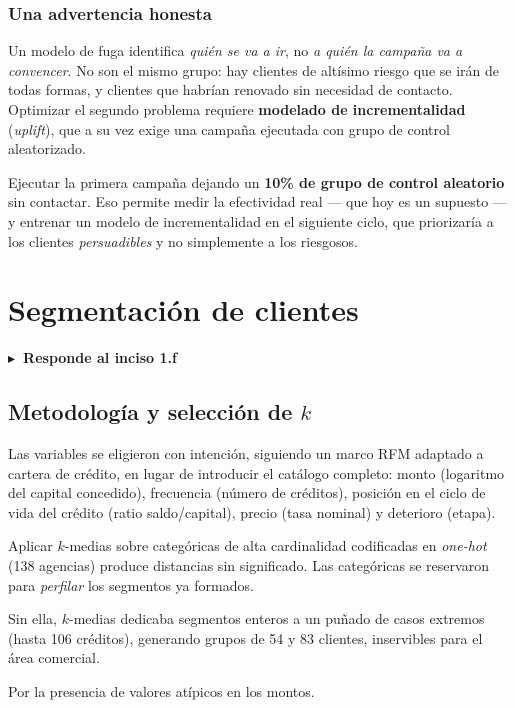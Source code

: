 \documentclass[11pt,a4paper]{article}
\newcommand{\inciso}[1]{%
  \vspace{0.2em}\noindent\textcolor{gacento}{\sffamily\bfseries\small
  $\blacktriangleright$~Responde al inciso #1}\vspace{0.3em}\par}
\begin{document}
\subsubsection*{Una advertencia honesta}

Un modelo de fuga identifica \emph{quién se va a ir}, no \emph{a quién la campaña
va a convencer}. No son el mismo grupo: hay clientes de altísimo riesgo que se
irán de todas formas, y clientes que habrían renovado sin necesidad de contacto.
Optimizar el segundo problema requiere \textbf{modelado de incrementalidad}
(\emph{uplift}), que a su vez exige una campaña ejecutada con grupo de control
aleatorizado.

\begin{hallazgo}
Ejecutar la primera campaña dejando un \textbf{10\% de grupo de control aleatorio}
sin contactar. Eso permite medir la efectividad real --- que hoy es un supuesto ---
y entrenar un modelo de incrementalidad en el siguiente ciclo, que priorizaría a
los clientes \emph{persuadibles} y no simplemente a los riesgosos.
\end{hallazgo}

\section{Segmentación de clientes}
\label{sec:segmentacion}
\inciso{1.f}

\subsection{Metodología y selección de $k$}

Las variables se eligieron con intención, siguiendo un marco RFM adaptado a
cartera de crédito, en lugar de introducir el catálogo completo: monto
(logaritmo del capital concedido), frecuencia (número de créditos), posición en el
ciclo de vida del crédito (ratio saldo/capital), precio (tasa nominal) y
deterioro (etapa).

\begin{description}[leftmargin=1.4em,style=nextline,nosep]
\item[Sólo variables numéricas] Aplicar $k$-medias sobre categóricas de alta
      cardinalidad codificadas en \emph{one-hot} (138 agencias) produce distancias
      sin significado. Las categóricas se reservaron para \emph{perfilar} los
      segmentos ya formados.
\item[Winsorización en los percentiles 1 y 99] Sin ella, $k$-medias dedicaba
      segmentos enteros a un puñado de casos extremos (hasta 106 créditos),
      generando grupos de 54 y 83 clientes, inservibles para el área comercial.
\item[Escalado robusto] Por la presencia de valores atípicos en los montos.
\end{description}
\end{document}
